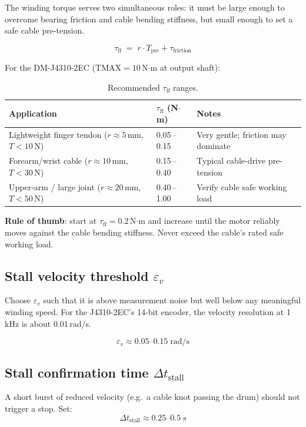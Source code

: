 \documentclass[11pt,a4paper]{article}
\begin{document}
The winding torque serves two simultaneous roles: it must be large enough to
overcome bearing friction and cable bending stiffness, but small enough to
set a safe cable pre-tension.

\[
  \tau_\text{ff} \;=\; r \cdot T_\text{pre} + \tau_\text{friction}
\]

For the DM-J4310-2EC ($\text{TMAX} = 10$\,N$\cdot$m at output shaft):

\begin{table}[ht]
\centering
\caption{Recommended $\tau_\text{ff}$ ranges.}
\label{tab:tau}
\begin{tabular}{lll}
\toprule
Application & $\tau_\text{ff}$ (N$\cdot$m) & Notes \\
\midrule
Lightweight finger tendon ($r \approx 5$\,mm, $T < 10$\,N)
  & 0.05\,--\,0.15 & Very gentle; friction may dominate \\
Forearm/wrist cable ($r \approx 10$\,mm, $T < 30$\,N)
  & 0.15\,--\,0.40 & Typical cable-drive pre-tension \\
Upper-arm / large joint ($r \approx 20$\,mm, $T < 50$\,N)
  & 0.40\,--\,1.00 & Verify cable safe working load \\
\bottomrule
\end{tabular}
\end{table}

\noindent\textbf{Rule of thumb}: start at $\tau_\text{ff} = 0.2$\,N$\cdot$m and
increase until the motor reliably moves against the cable bending stiffness.
Never exceed the cable's rated safe working load.

\subsection{Stall velocity threshold $\varepsilon_v$}

Choose $\varepsilon_v$ such that it is above measurement noise but well below
any meaningful winding speed.  For the J4310-2EC's 14-bit encoder,
the velocity resolution at 1\,kHz is about $0.01$\,rad/s.

\[
  \varepsilon_v \approx 0.05\text{--}0.15\;\mathrm{rad/s}
\]

\subsection{Stall confirmation time $\Delta t_\text{stall}$}

A short burst of reduced velocity (e.g.\ a cable knot passing the drum)
should not trigger a stop.  Set:
\[
  \Delta t_\text{stall} \approx 0.25\text{--}0.5\;\mathrm{s}
\]
\end{document}
